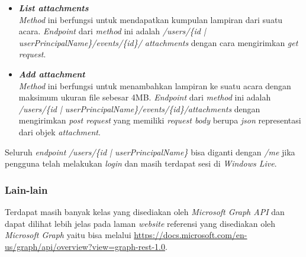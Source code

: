 \begin{itemize}
	\item \textbf{\textit{List attachments}}\\
	\textit{Method} ini berfungsi untuk mendapatkan kumpulan lampiran dari suatu acara. \textit{Endpoint} dari \textit{method} ini adalah \textit{/users\textit{/\{}id | userPrincipalName\}/events/\{id\}/ attachments} dengan cara mengirimkan \textit{get request}. 
	\item \textbf{\textit{Add attachment}}\\
	\textit{Method} ini berfungsi untuk menambahkan lampiran ke suatu acara dengan maksimum ukuran file sebesar 4MB. \textit{Endpoint} dari \textit{method} ini adalah \textit{/users/\{id | userPrincipalName\}/events/\{id\}/attachments} dengan mengirimkan \textit{post request} yang memiliki \textit{request body} berupa \textit{json} representasi dari objek \textit{attachment}. 
\end{itemize}

Seluruh \textit{endpoint} \textit{/users/\{id | userPrincipalName\}} bisa diganti dengan \textit{/me} jika pengguna telah melakukan \textit{login} dan masih terdapat sesi di \textit{Windows Live}. 

\subsubsection{Lain-lain}
Terdapat masih banyak kelas yang disediakan oleh \textit{Microsoft Graph API} dan dapat dilihat lebih jelas pada laman \textit{website} referensi yang disediakan oleh \textit{Microsoft Graph} yaitu bisa melalui \url{https://docs.microsoft.com/en-us/graph/api/overview?view=graph-rest-1.0}. 

